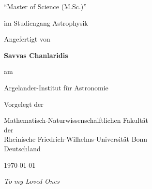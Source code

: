 \documentclass[a4paper, 11pt, twoside]{book}
\def\thesisauthor{Savvas Chanlaridis}
\newenvironment{dedication}
  {\clearpage
   \thispagestyle{empty}
   \vspace*{\stretch{1}}
   \itshape
   \raggedleft}
  {\par
   \vspace{\stretch{3}}
   \clearpage}
\begin{document}
\begin{titlepage}
\begin{center}
           “Master of Science (M.Sc.)” \\
           
            \vspace{1.0cm}
            
          im Studiengang Astrophysik

            \vspace{1cm}

            {\normalsize Angefertigt von} 
             
           \vspace{0.5cm}            
            
            \textbf{\thesisauthor}
            
            \vspace{1cm}
            
            {\normalsize am}
            
            \vspace{0.5cm}
            
            \Large
            
            Argelander-Institut f\"ur Astronomie

            \vspace{1cm}
            
            {\normalsize Vorgelegt der }
            
            \vspace{0.5cm}


            \Large
         
            Mathematisch-Naturwissenschalftlichen Fakult\"at \\
            der \\
            Rheinische Friedrich-Wilhelms-Universit\"at Bonn\\
            Deutschland

            \vspace{1.5cm}

            \Large
            \today

        \end{center}
    \end{titlepage}

    \newpage  %
    \mbox{}
    \thispagestyle{empty}

    \begin{dedication}
    To my Loved Ones
    \end{dedication}
\end{document}
